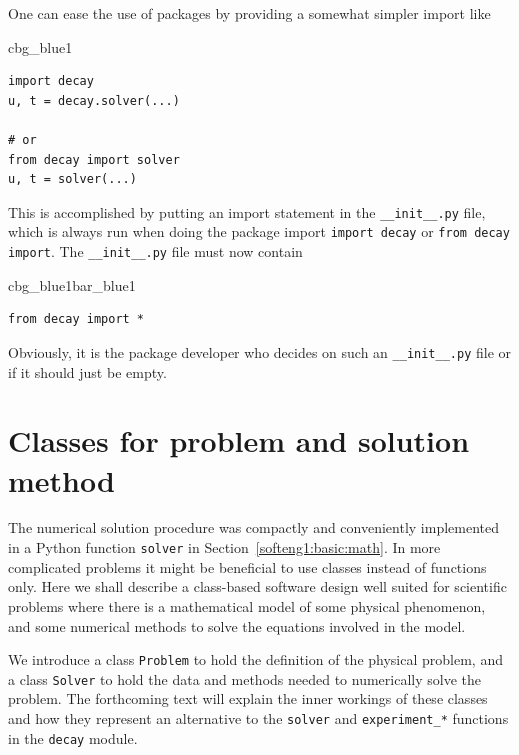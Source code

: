 \documentclass[%
oneside,                 %
final,                   %
10pt]{article}
\newenvironment{_cod_tight}[1]{
   \def\FrameCommand{\colorbox{#1}}
   \FrameRule0.6pt\MakeFramed {\FrameRestore}\vskip3mm}
   {\vskip0mm\endMakeFramed}
\newenvironment{cod}[1]{
\bgroup\rmfamily
\fboxsep=0mm\relax
\begin{_cod_tight}{#1}
\list{}{\parsep=-2mm\parskip=0mm\topsep=0pt\leftmargin=2mm
\rightmargin=2\leftmargin\leftmargin=4pt\relax}
\item\relax}
{\endlist\end{_cod_tight}\egroup}
\newenvironment{_pro_tight}[2]{
   \def\FrameCommand{\color{#2}\vrule width 1mm\normalcolor\colorbox{#1}}
   \FrameRule0.6pt\MakeFramed {\advance\hsize-2mm\FrameRestore}\vskip3mm}
   {\vskip0mm\endMakeFramed}
\newenvironment{pro}[2]{
\bgroup\rmfamily
\fboxsep=0mm\relax
\begin{_pro_tight}{#1}{#2}
\list{}{\parsep=-2mm\parskip=0mm\topsep=0pt\leftmargin=2mm
\rightmargin=2\leftmargin\leftmargin=4pt\relax}
\item\relax}
{\endlist\end{_pro_tight}\egroup}
\newenvironment{notice_mdfboxadmon}[1][]{
\begin{notice_mdfboxmdframed}[frametitle=#1]
}
{
\end{notice_mdfboxmdframed}
}
\begin{document}
\begin{notice_mdfboxadmon}
One can ease the use of packages by providing a somewhat simpler
import like

\begin{cod}{cbg_blue1}\begin{Verbatim}[numbers=none,fontsize=\fontsize{9pt}{9pt},baselinestretch=0.95,xleftmargin=2mm]
import decay
u, t = decay.solver(...)

# or
from decay import solver
u, t = solver(...)
\end{Verbatim}
\end{cod}
\noindent
This is accomplished by putting an import statement in the \Verb!__init__.py!
file, which is always run when doing the package import \texttt{import decay}
or \texttt{from decay import}. The \Verb!__init__.py! file must now contain

\begin{pro}{cbg_blue1}{bar_blue1}\begin{Verbatim}[numbers=none,fontsize=\fontsize{9pt}{9pt},baselinestretch=0.95,xleftmargin=2mm]
from decay import *
\end{Verbatim}
\end{pro}
\noindent
Obviously, it is the package developer who decides on such an
\Verb!__init__.py! file or if it should just be empty.
\end{notice_mdfboxadmon}




\section{Classes for problem and solution method}
\label{softeng1:prog:se:class}

The numerical solution procedure was compactly and conveniently
implemented in a Python function \texttt{solver} in Section~\ref{softeng1:basic:math}.  In more complicated problems it might be
beneficial to use classes instead of functions only. Here we shall
describe a class-based software design well suited for scientific
problems where there is a mathematical model of some physical
phenomenon, and some numerical methods to solve the equations involved
in the model.

We introduce a class \texttt{Problem} to hold the definition of the physical
problem, and a class \texttt{Solver} to hold the data and methods needed to
numerically solve the problem.  The forthcoming text will explain the
inner workings of these classes and how they represent an alternative
to the \texttt{solver} and \Verb!experiment_*! functions in the \texttt{decay}
module.
\end{document}
